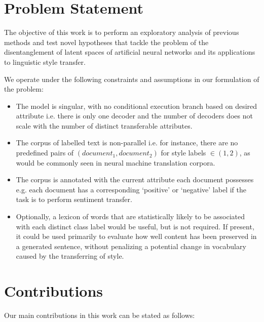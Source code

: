 \section{Problem Statement}

The objective of this work is to perform an exploratory analysis of previous methods and test novel hypotheses that tackle the problem of the disentanglement of latent spaces of artificial neural networks and its applications to linguistic style transfer.

We operate under the following constraints and assumptions in our formulation of the problem:

\begin{itemize}
	\item The model is singular, with no conditional execution branch based on desired attribute i.e. there is only one decoder and the number of decoders does not scale with the number of distinct transferable attributes.
	\item The corpus of labelled text is non-parallel i.e. for instance, there are no predefined pairs of $(document_1, document_2)$ for style labels $\in (1, 2)$, as would be commonly seen in neural machine translation corpora.
	\item The corpus is annotated with the current attribute each document possesses e.g. each document has a corresponding `positive' or `negative' label if the task is to perform sentiment transfer.
	\item Optionally, a lexicon of words that are statistically likely to be associated with each distinct class label would be useful, but is not required. If present, it could be used primarily to evaluate how well content has been preserved in a generated sentence, without penalizing a potential change in vocabulary caused by the transferring of style.
\end{itemize}


\section{Contributions}

Our main contributions in this work can be stated as follows:

